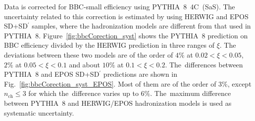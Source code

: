 Data is corrected for BBC-small efficiency using PYTHIA~8~4C~(SaS).  The uncertainty related to this correction is  estimated by using HERWIG and EPOS SD+SD$^\prime$ samples, where the hadronization models are different from that used in PYTHIA~8. Figure~\ref{fig:bbcCorection_syst} shows the PYTHIA~8  prediction on BBC efficiency  divided by the HERWIG prediction in three ranges of $\xi$. The deviations between these two models are of the order of $4\%$ at $0.02<\xi<0.05$, $2\%$ at $0.05<\xi<0.1$ and about $10\%$ at  $0.1<\xi<0.2$. The~differences between PYTHIA~8 and EPOS SD+SD$^\prime$ predictions are shown in Fig.~\ref{fig:bbcCorection_syst_EPOS}. Most of them are of the order of $3\%$, except $n_\textrm{ch}\leq 3$ for which the~difference varies up to $6\%$. The~maximum difference between PYTHIA~8 and HERWIG/EPOS hadronization models is used as systematic uncertainty. 


